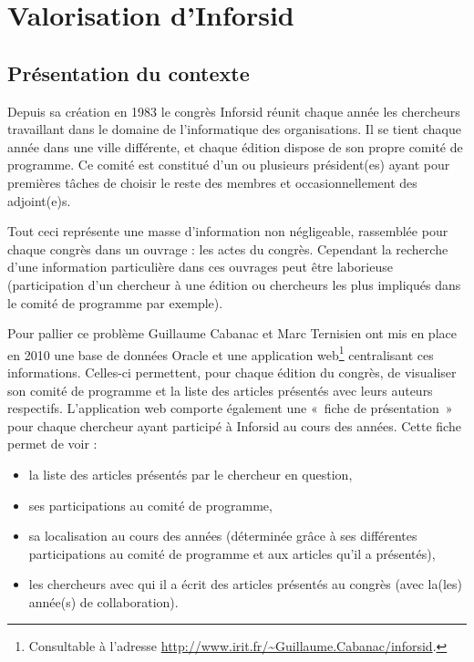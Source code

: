 \cleardoublepage
{}

\chapter{Valorisation d'Inforsid}


	\section{Présentation du contexte}
		Depuis sa création en 1983 le congrès Inforsid réunit chaque année les chercheurs travaillant dans le domaine de l'informatique des organisations. Il se tient chaque année dans une ville différente, et chaque édition dispose de son propre comité de programme. Ce comité est constitué d'un ou plusieurs président(es) ayant pour premières tâches de choisir le reste des membres et occasionnellement des adjoint(e)s.
	
		Tout ceci représente une masse d'information non négligeable, rassemblée pour chaque congrès dans un ouvrage : les actes du congrès. Cependant la recherche d'une information particulière dans ces ouvrages peut être laborieuse (participation d'un chercheur à une édition ou chercheurs les plus impliqués dans le comité de programme par exemple).
		
		Pour pallier ce problème Guillaume Cabanac et Marc Ternisien ont mis en place en 2010 une base de données Oracle et une application web\footnote{Consultable à l'adresse \url{http://www.irit.fr/~Guillaume.Cabanac/inforsid}.} centralisant ces informations. Celles-ci permettent, pour chaque édition du congrès, de visualiser son comité de programme et la liste des articles présentés avec leurs auteurs respectifs. L'application web comporte également une «~fiche de présentation~» pour chaque chercheur ayant participé à Inforsid au cours des années. Cette fiche permet de voir :
		\begin{itemize}
			\item la liste des articles présentés par le chercheur en question,
			\item ses participations au comité de programme,
			\item sa localisation au cours des années (déterminée grâce à ses différentes participations au comité de programme et aux articles qu'il a présentés),
			\item les chercheurs avec qui il a écrit des articles présentés au congrès (avec la(les) année(s) de collaboration).
		\end{itemize}
		
